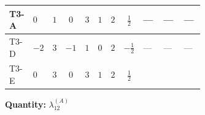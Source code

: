 \documentclass[8pt]{article}
\begin{document}
\begin{landscape}
\begin{longtable}{@{}llcccccc >{\raggedright\arraybackslash}p{0.21\linewidth} >{\raggedright\arraybackslash}p{0.21\linewidth} >{\raggedright\arraybackslash}p{0.21\linewidth}@{}}
\midrule
T3-A & $0$ & $1$ & $0$ & $3$ & $1$ & $2$ & $\frac{1}{2}$ & --- & --- & --- \\
\midrule
T3-D & $-2$ & $3$ & $-1$ & $1$ & $0$ & $2$ & $-\frac{1}{2}$ & --- & --- & --- \\
\midrule
T3-E & $0$ & $3$ & $0$ & $3$ & $1$ & $2$ & $\frac{1}{2}$ & \scriptsize\adjustbox{max width=\linewidth}{$\begin{gathered} +8 {\lambda_{12}^{(1)}} {\lambda_{12}^{(A)}}\end{gathered}$} & \scriptsize\adjustbox{max width=\linewidth}{$\begin{gathered} +2 {\lambda_{12}^{(A)}} {\lambda_{S_1}^{(1)}}\end{gathered}$} & \scriptsize\adjustbox{max width=\linewidth}{$\begin{gathered} +2 {\lambda_{12}^{(A)}} {\lambda_{S_2}^{(1)}}\end{gathered}$} \\
\midrule
\bottomrule
\end{longtable}
\clearpage
\noindent\textbf{Quantity: }$\lambda_{12}^{(A)}$\par\smallskip

\end{landscape}
\end{document}
